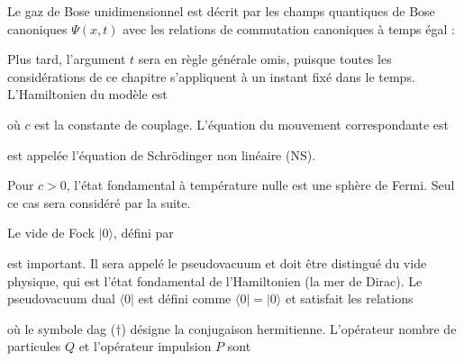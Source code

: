 Le gaz de Bose unidimensionnel est décrit par les champs quantiques de Bose canoniques \( \Psi(x,t) \) avec les relations de commutation canoniques à temps égal :

Plus tard, l'argument \( t \) sera en règle générale omis, puisque toutes les considérations de ce chapitre s'appliquent à un instant fixé dans le temps.  
L'Hamiltonien du modèle est

où \( c \) est la constante de couplage. L'équation du mouvement correspondante est

est appelée l'équation de Schrödinger non linéaire (NS).  

Pour \( c > 0 \), l'état fondamental à température nulle est une sphère de Fermi. Seul ce cas sera considéré par la suite.  

Le vide de Fock \( |0\rangle \), défini par

est important. Il sera appelé le pseudovacuum et doit être distingué du vide physique, qui est l'état fondamental de l'Hamiltonien (la mer de Dirac). Le pseudovacuum dual \(\langle 0|\) est défini comme \(\langle 0| = |0\rangle\) et satisfait les relations

où le symbole dag (\(\dagger\)) désigne la conjugaison hermitienne. L'opérateur nombre de particules \(Q\) et l'opérateur impulsion \(P\) sont

